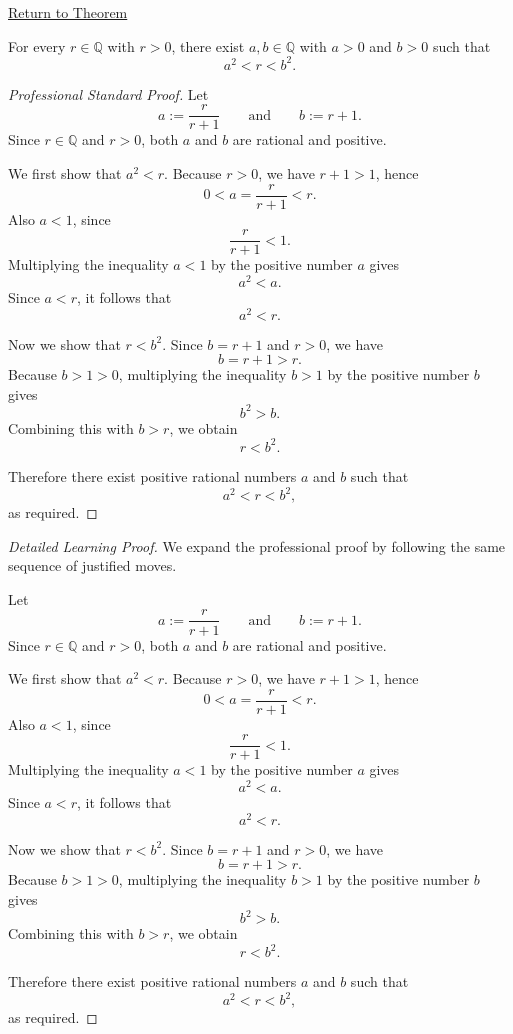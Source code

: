 \newpage
{}
\label{prf:rational-square-bracketing}

\begin{remark*}[Return]
\hyperref[thm:rational-square-bracketing]{Return to Theorem}
\end{remark*}

\begin{theorem*}
For every $r\in\mathbb{Q}$ with $r>0$, there exist $a,b\in\mathbb{Q}$ with
$a>0$ and $b>0$ such that
\[
a^2<r<b^2.
\]
\end{theorem*}

\begin{proof}[Professional Standard Proof]
\LRAProofBodyStart
Let
\[
a:=\frac{r}{r+1}
\qquad\text{and}\qquad
b:=r+1.
\]
Since $r\in\mathbb{Q}$ and $r>0$, both $a$ and $b$ are rational and positive.

We first show that $a^2<r$. Because $r>0$, we have $r+1>1$, hence
\[
0<a=\frac{r}{r+1}<r.
\]
Also $a<1$, since
\[
\frac{r}{r+1}<1.
\]
Multiplying the inequality $a<1$ by the positive number $a$ gives
\[
a^2<a.
\]
Since $a<r$, it follows that
\[
a^2<r.
\]

Now we show that $r<b^2$. Since $b=r+1$ and $r>0$, we have
\[
b=r+1>r.
\]
Because $b>1>0$, multiplying the inequality $b>1$ by the positive number $b$
gives
\[
b^2>b.
\]
Combining this with $b>r$, we obtain
\[
r<b^2.
\]

Therefore there exist positive rational numbers $a$ and $b$ such that
\[
a^2<r<b^2,
\]
as required.
\end{proof}

\begin{proof}[Detailed Learning Proof]
\LRAProofBodyStart
We expand the professional proof by following the same sequence of justified moves.

Let
\[
a:=\frac{r}{r+1}
\qquad\text{and}\qquad
b:=r+1.
\]
Since $r\in\mathbb{Q}$ and $r>0$, both $a$ and $b$ are rational and positive.

We first show that $a^2<r$. Because $r>0$, we have $r+1>1$, hence
\[
0<a=\frac{r}{r+1}<r.
\]
Also $a<1$, since
\[
\frac{r}{r+1}<1.
\]
Multiplying the inequality $a<1$ by the positive number $a$ gives
\[
a^2<a.
\]
Since $a<r$, it follows that
\[
a^2<r.
\]

Now we show that $r<b^2$. Since $b=r+1$ and $r>0$, we have
\[
b=r+1>r.
\]
Because $b>1>0$, multiplying the inequality $b>1$ by the positive number $b$
gives
\[
b^2>b.
\]
Combining this with $b>r$, we obtain
\[
r<b^2.
\]

Therefore there exist positive rational numbers $a$ and $b$ such that
\[
a^2<r<b^2,
\]
as required.
\end{proof}

